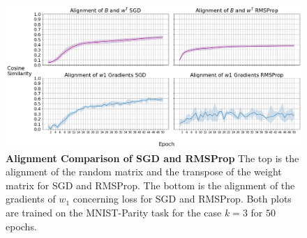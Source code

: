 \documentclass[a4paper, nobind]{templates/ociamthesis}
\begin{document}
\begin{figure}

{\centering \includegraphics[width=1\linewidth]{figures/3_k3_SGD_RMSProp_DFA_Alingment} 

}

\caption[Alignment Comparison of SGD and RMSProp]{\textbf{Alignment Comparison of SGD and RMSProp} \newline The top is the alignment of the random matrix and the transpose of the weight matrix for SGD and RMSProp. The bottom is the alignment of the gradients of $w_1$ concerning loss for SGD and RMSProp. Both plots are trained on the MNIST-Parity task for the case $k=3$ for $50$ epochs.}\label{fig:Alignment}
\end{figure}
\end{document}
